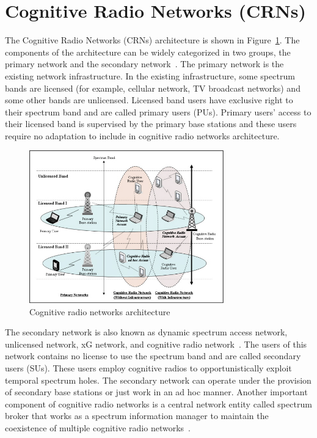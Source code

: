 \section{Cognitive Radio Networks (CRNs)}

The Cognitive Radio Networks (CRNs) architecture is shown in Figure~\ref{fig:cogArch}. The components of the architecture can be widely categorized in two groups, the primary network and the secondary network~\cite{akyildiz2006next}. The primary network is the existing network infrastructure. In the existing infrastructure, some spectrum bands are licensed (for example, cellular network, TV broadcast networks) and some other bands are unlicensed. Licensed band users have exclusive right to their spectrum band and are called primary users (PUs). Primary users' access to their licensed band is supervised by the primary base stations and these users require no adaptation to include in cognitive radio networks architecture. 

\begin{figure}[!htbp]
    \begin{center}
        \includegraphics[width=0.75\textwidth]{myFigures/cogarchSir.jpg}
        \caption{Cognitive radio networks architecture~\cite{bwnGatechProjectDescription}}
        \label{fig:cogArch}
    \end{center}
\end{figure}

The secondary network is also known as dynamic spectrum access network, unlicensed network, xG network, and cognitive radio network~\cite{akyildiz2006next}. The users of this network contains no license to use the spectrum band and are called secondary users (SUs). These users employ cognitive radios to opportunistically exploit temporal spectrum holes. The secondary network can operate under the provision of secondary base stations or just work in an ad hoc manner. Another important component of cognitive radio networks is a central network entity called spectrum broker that works as a spectrum information manager to maintain the coexistence of multiple cognitive radio networks~\cite{akyildiz2006next, buddhikot2005dimsumnet, ileri2005demand, zekavat2005user}.

